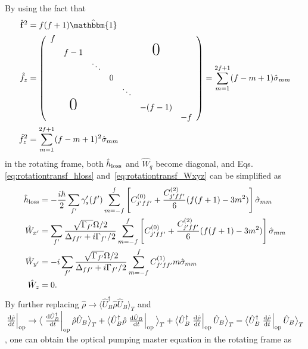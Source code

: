 \documentclass[preprint,aps,pra,onecolumn,superscriptaddress]{revtex4-1} %
\newcommand{\dt}[1]{\frac{{\mathrm d} {#1}}{{\mathrm d}t}}
\newcommand{\expect}[1]{\big\langle #1 \big\rangle}
\begin{document}
\begin{appendix}
By using the fact that 
\begin{subequations}
\begin{align}
\hat{\mathbf{f}}^2 &=f(f+1)\hat{\mathbbm{1}}\\
\hat{f}_z &= \left(
    \begin{array}{ccccccc}
    f                                      		\\
      & f-1           &      & &      &\text{\huge0}\\
      &               &\ddots& 					\\
      &               &      &0                	\\
      &               &      & &\ddots          \\
      & \text{\huge0} &      & &      &-(f-1)   \\
      &               &      & &      &      &-f
    \end{array}
    \right)=\sum_{m=1}^{2f+1}(f-m+1)\hat{\sigma}_{mm}\\
\hat{f}_z^2 &= \sum_{m=1}^{2f+1}(f-m+1)^2\hat{\sigma}_{mm}
\end{align}
\end{subequations}
in the rotating frame, both $ \hat{h}_{\rm loss} $ and $ \hat{W}_{q} $ become diagonal, and Eqs.\eqref{eq:rotationtransf_hloss} and~\eqref{eq:rotationtransf_Wxyz} can be simplified as
\begin{subequations}
\begin{align}
\hat{h}_{\rm loss} &= -\frac{i\hbar}{2} \sum_{f'} \gamma'_s(f') \sum_{m=-f}^f\left[C_{j'ff'}^{(0)} + \frac{C_{j'ff'}^{(2) }}{6}(f(f+1)-3m^2) \right]\hat{\sigma}_{mm}\\
\hat{W}_{x'} &= \sum_{f'} \frac{\sqrt{\Gamma_{f'} }\Omega/2}{\Delta_{ff'}+i\Gamma_{f'}/2 } \sum_{m=-f}^f\left[C_{j'ff'}^{(0)} + \frac{C_{j'ff'}^{(2) }}{6}(f(f+1)-3m^2) \right]\hat{\sigma}_{mm}\\
\hat{W}_{y'} &= -i \sum_{f'} \frac{\sqrt{\Gamma_{f'} }\Omega/2}{\Delta_{ff'}+i\Gamma_{f'}/2 } \sum_{m=-f}^f C_{f'ff'}^{(1)}m\hat{\sigma}_{mm}\\
\hat{W}_z &=0.
\end{align}
\end{subequations}
By further replacing $ \hat{\rho}\rightarrow \expect{\hat{U}_B^\dagger \hat{\rho}\hat{U}_B }_T$ and $ \left. \dt{\hat{\rho}}\right|_{\rm op}\rightarrow \expect{\left.\dt{\hat{U}_B^\dagger}\right|_{\rm op}\hat{\rho}\hat{U}_B}_T + \expect{\hat{U}_B^\dagger\hat{\rho}\left. \dt{\hat{U}_B}\right|_{\rm op}}_T +\expect{\hat{U}_B^\dagger\left.\dt{\hat{\rho}}\right|_{\rm op}\hat{U}_B}_T= \expect{\hat{U}_B^\dagger\left.\dt{\hat{\rho}}\right|_{\rm op}\hat{U}_B}_T$, one can obtain the optical pumping master equation in the rotating frame as

\end{appendix}
\end{document}
